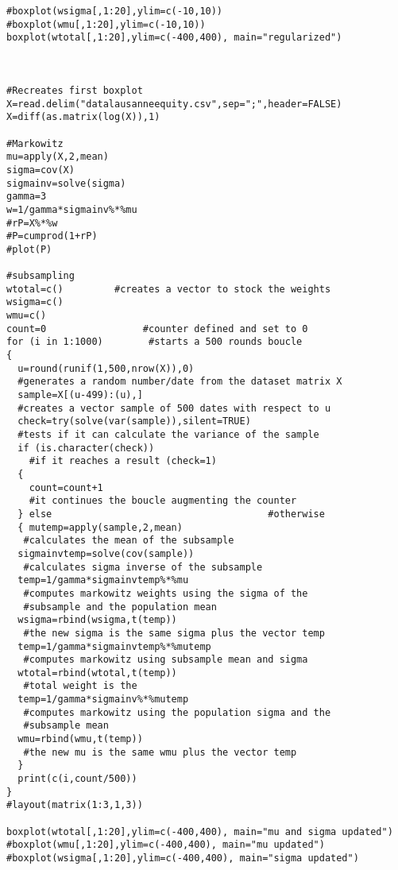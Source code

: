 \begin{appendices}
\begin{verbatim}
#boxplot(wsigma[,1:20],ylim=c(-10,10))
#boxplot(wmu[,1:20],ylim=c(-10,10))
boxplot(wtotal[,1:20],ylim=c(-400,400), main="regularized")



#Recreates first boxplot
X=read.delim("datalausanneequity.csv",sep=";",header=FALSE)
X=diff(as.matrix(log(X)),1)

#Markowitz
mu=apply(X,2,mean)
sigma=cov(X)
sigmainv=solve(sigma)
gamma=3
w=1/gamma*sigmainv%*%mu
#rP=X%*%w
#P=cumprod(1+rP)
#plot(P)

#subsampling
wtotal=c()         #creates a vector to stock the weights
wsigma=c()
wmu=c()
count=0                 #counter defined and set to 0
for (i in 1:1000)        #starts a 500 rounds boucle
{
  u=round(runif(1,500,nrow(X)),0)               
  #generates a random number/date from the dataset matrix X
  sample=X[(u-499):(u),]                        
  #creates a vector sample of 500 dates with respect to u
  check=try(solve(var(sample)),silent=TRUE)     
  #tests if it can calculate the variance of the sample
  if (is.character(check))                      
    #if it reaches a result (check=1)
  {
    count=count+1                             
    #it continues the boucle augmenting the counter
  } else                                      #otherwise
  { mutemp=apply(sample,2,mean)               
   #calculates the mean of the subsample
  sigmainvtemp=solve(cov(sample))           
   #calculates sigma inverse of the subsample
  temp=1/gamma*sigmainvtemp%*%mu            
   #computes markowitz weights using the sigma of the
   #subsample and the population mean
  wsigma=rbind(wsigma,t(temp))              
   #the new sigma is the same sigma plus the vector temp
  temp=1/gamma*sigmainvtemp%*%mutemp        
   #computes markowitz using subsample mean and sigma
  wtotal=rbind(wtotal,t(temp))              
   #total weight is the 
  temp=1/gamma*sigmainv%*%mutemp            
   #computes markowitz using the population sigma and the
   #subsample mean
  wmu=rbind(wmu,t(temp))                    
   #the new mu is the same wmu plus the vector temp 
  }
  print(c(i,count/500))
}
#layout(matrix(1:3,1,3))

boxplot(wtotal[,1:20],ylim=c(-400,400), main="mu and sigma updated")
#boxplot(wmu[,1:20],ylim=c(-400,400), main="mu updated")
#boxplot(wsigma[,1:20],ylim=c(-400,400), main="sigma updated")

\end{verbatim}

\end{appendices}

